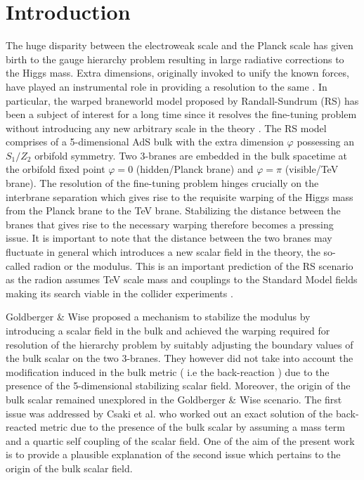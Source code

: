 \documentclass{article}
\begin{document}
\section{Introduction}
The huge disparity between the electroweak scale and the Planck scale has given birth to the gauge hierarchy problem resulting in large radiative corrections to the Higgs mass. Extra dimensions, originally invoked to unify the known forces, have played an instrumental role in providing a resolution to the same \cite{Antoniadis:1990ew, Horava:1995qa, Horava:1996ma, PhysRevD.54.R3693, Kakushadze:1998wp, ArkaniHamed:1998rs,  Antoniadis:1998ig, PhysRevD.59.086004, Randall:1999ee, Randall:1999vf, Lykken:1999nb, Kaloper:1999sm}. In particular, the warped braneworld model proposed by Randall-Sundrum (RS) has been a subject of interest for a long time since it resolves the fine-tuning problem without introducing any new arbitrary scale in the theory \cite{Randall:1999ee}. The RS model comprises of a 5-dimensional AdS bulk with the extra dimension $\varphi$ possessing an $S_1 /Z_2$ orbifold symmetry. Two 3-branes are embedded in the bulk spacetime at the orbifold fixed point $\varphi=0$ (hidden/Planck brane) and $\varphi=\pi$ (visible/TeV brane). The resolution of the fine-tuning problem hinges crucially on the interbrane separation which gives rise to the requisite warping of the Higgs mass from the Planck brane to the TeV brane. Stabilizing the distance between the branes that gives rise to the necessary warping therefore becomes a pressing issue.
It is important to note that the distance between the two branes may fluctuate in general which introduces a new scalar field in the theory, 
the so-called radion or the modulus. This is an important prediction of the RS scenario as the radion assumes TeV scale mass and couplings 
to the Standard Model fields making its search viable in the collider experiments \cite{GOLDBERGER2000275,Csaki:2000zn,Paul:2016itm,Mitra:2017run}.

 
Goldberger \& Wise \cite{Goldberger:1999uk,GOLDBERGER2000275} proposed a mechanism to stabilize the modulus 
by introducing a scalar field in the bulk and achieved the warping required for resolution of the hierarchy 
problem by suitably adjusting the boundary values of the bulk scalar on the two 3-branes. 
They however did not take into account the modification induced in the bulk metric ( i.e the back-reaction ) 
due to the presence of the 5-dimensional stabilizing scalar field. Moreover, the origin of the bulk scalar remained unexplored 
in the Goldberger \& Wise scenario. The first issue was addressed by Csaki et al. \cite{Csaki:2000zn} who worked out an exact solution 
of the back-reacted metric due to the presence of the bulk scalar by assuming a mass term and a quartic self coupling of the scalar field. 
One of the  aim of the present work is to provide a plausible explanation of the second issue which pertains to the origin of the bulk scalar field. 
\end{document}
